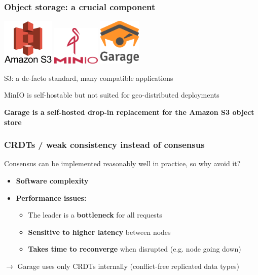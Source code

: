 \documentclass[aspectratio=169]{beamer}
\begin{document}
\begin{frame}
	\frametitle{Object storage: a crucial component}
		\begin{center}
			\includegraphics[height=6em]{../assets/Amazon-S3.jpg}
			\hspace{3em}
			\includegraphics[height=5em]{../assets/minio.png}
			\hspace{3em}
			\includegraphics[height=6em]{../../logo/garage_hires_crop.png}
		\end{center}
		\vspace{1em}
	S3: a de-facto standard, many compatible applications

	\vspace{1em}

	MinIO is self-hostable but not suited for geo-distributed deployments

	\vspace{1em}

	\textbf{Garage is a self-hosted drop-in replacement for the Amazon S3 object store}
\end{frame}

\begin{frame}
	\frametitle{CRDTs / weak consistency instead of consensus}
	Consensus can be implemented reasonably well in practice, so why avoid it?
	\vspace{1em}
	\begin{itemize}
		\item \textbf{Software complexity}
			\vspace{1em}
		\item \textbf{Performance issues:}
			\vspace{.5em}
			\begin{itemize}
				\item The leader is a \textbf{bottleneck} for all requests\\
					\vspace{.5em}
				\item \textbf{Sensitive to higher latency} between nodes
					\vspace{.5em}
				\item \textbf{Takes time to reconverge} when disrupted (e.g. node going down)
			\end{itemize}
	\end{itemize}
	\vspace{2em}
	$\to$ Garage uses only CRDTs internally (conflict-free replicated data types)
\end{frame}
\end{document}
